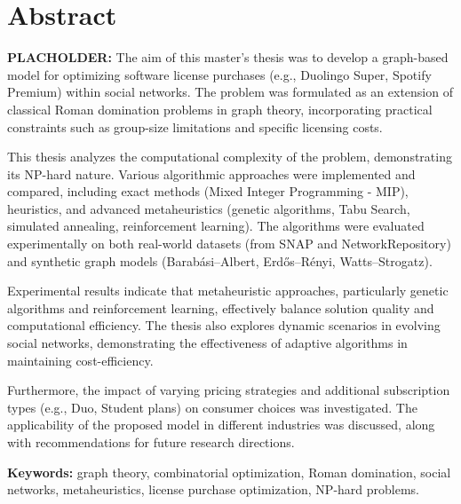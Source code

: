 \section*{Abstract}

\textbf{PLACHOLDER:} The aim of this master's thesis was to develop a graph-based model for optimizing software license purchases (e.g., Duolingo Super, Spotify Premium) within social networks. The problem was formulated as an extension of classical Roman domination problems in graph theory, incorporating practical constraints such as group-size limitations and specific licensing costs.

This thesis analyzes the computational complexity of the problem, demonstrating its NP-hard nature. Various algorithmic approaches were implemented and compared, including exact methods (Mixed Integer Programming - MIP), heuristics, and advanced metaheuristics (genetic algorithms, Tabu Search, simulated annealing, reinforcement learning). The algorithms were evaluated experimentally on both real-world datasets (from SNAP and NetworkRepository) and synthetic graph models (Barabási–Albert, Erdős–Rényi, Watts–Strogatz).

Experimental results indicate that metaheuristic approaches, particularly genetic algorithms and reinforcement learning, effectively balance solution quality and computational efficiency. The thesis also explores dynamic scenarios in evolving social networks, demonstrating the effectiveness of adaptive algorithms in maintaining cost-efficiency.

Furthermore, the impact of varying pricing strategies and additional subscription types (e.g., Duo, Student plans) on consumer choices was investigated. The applicability of the proposed model in different industries was discussed, along with recommendations for future research directions.

\textbf{Keywords:} graph theory, combinatorial optimization, Roman domination, social networks, metaheuristics, license purchase optimization, NP-hard problems.
